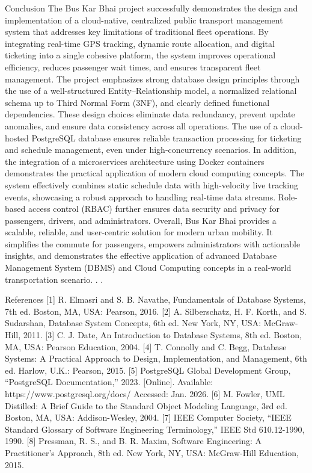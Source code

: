 Conclusion
The Bus Kar Bhai project successfully demonstrates the design and implementation of a cloud-native, centralized public transport management system that addresses key limitations of traditional fleet operations. By integrating real-time GPS tracking, dynamic route allocation, and digital ticketing into a single cohesive platform, the system improves operational efficiency, reduces passenger wait times, and ensures transparent fleet management.
The project emphasizes strong database design principles through the use of a well-structured Entity–Relationship model, a normalized relational schema up to Third Normal Form (3NF), and clearly defined functional dependencies. These design choices eliminate data redundancy, prevent update anomalies, and ensure data consistency across all operations. The use of a cloud-hosted PostgreSQL database ensures reliable transaction processing for ticketing and schedule management, even under high-concurrency scenarios.
In addition, the integration of a microservices architecture using Docker containers demonstrates the practical application of modern cloud computing concepts. The system effectively combines static schedule data with high-velocity live tracking events, showcasing a robust approach to handling real-time data streams. Role-based access control (RBAC) further ensures data security and privacy for passengers, drivers, and administrators.
Overall, Bus Kar Bhai provides a scalable, reliable, and user-centric solution for modern urban mobility. It simplifies the commute for passengers, empowers administrators with actionable insights, and demonstrates the effective application of advanced Database Management System (DBMS) and Cloud Computing concepts in a real-world transportation scenario.
.
.










     References
[1] R. Elmasri and S. B. Navathe, Fundamentals of Database Systems, 7th ed. Boston, MA,
USA: Pearson, 2016.
[2] A. Silberschatz, H. F. Korth, and S. Sudarshan, Database System Concepts, 6th ed. New
York, NY, USA: McGraw-Hill, 2011.
[3] C. J. Date, An Introduction to Database Systems, 8th ed. Boston, MA, USA: Pearson
Education, 2004.
[4] T. Connolly and C. Begg, Database Systems: A Practical Approach to Design,
Implementation, and Management, 6th ed. Harlow, U.K.: Pearson, 2015.
[5] PostgreSQL Global Development Group, “PostgreSQL Documentation,” 2023. [Online].
Available: https://www.postgresql.org/docs/
Accessed: Jan. 2026.
[6] M. Fowler, UML Distilled: A Brief Guide to the Standard Object Modeling Language,
3rd ed. Boston, MA, USA: Addison-Wesley, 2004.
[7] IEEE Computer Society, “IEEE Standard Glossary of Software Engineering
Terminology,” IEEE Std 610.12-1990, 1990.
[8] Pressman, R. S., and B. R. Maxim, Software Engineering: A Practitioner’s Approach, 8th
ed. New York, NY, USA: McGraw-Hill Education, 2015.





